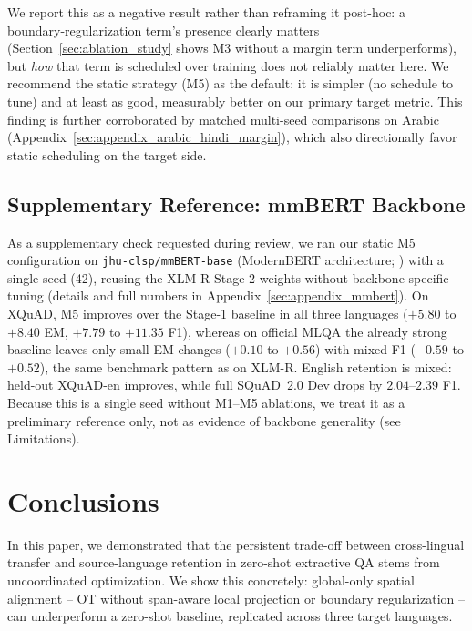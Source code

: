\documentclass[11pt]{article}
\begin{document}
We report this as a negative result rather than reframing it post-hoc: a boundary-regularization term's presence clearly matters (Section~\ref{sec:ablation_study} shows M3 without a margin term underperforms), but \emph{how} that term is scheduled over training does not reliably matter here. We recommend the static strategy (M5) as the default: it is simpler (no schedule to tune) and at least as good, measurably better on our primary target metric. This finding is further corroborated by matched multi-seed comparisons on Arabic (Appendix~\ref{sec:appendix_arabic_hindi_margin}), which also directionally favor static scheduling on the target side.

\subsection{Supplementary Reference: mmBERT Backbone}
\label{sec:mmbert_generalization}
As a supplementary check requested during review, we ran our static M5 configuration on \texttt{jhu-clsp/mmBERT-base} \citep{marone2026mmbert} (ModernBERT architecture; \citealp{warner-etal-2025-smarter}) with a single seed (42), reusing the XLM-R Stage-2 weights without backbone-specific tuning (details and full numbers in Appendix~\ref{sec:appendix_mmbert}). On XQuAD, M5 improves over the Stage-1 baseline in all three languages ($+5.80$ to $+8.40$ EM, $+7.79$ to $+11.35$ F1), whereas on official MLQA the already strong baseline leaves only small EM changes ($+0.10$ to $+0.56$) with mixed F1 ($-0.59$ to $+0.52$), the same benchmark pattern as on XLM-R. English retention is mixed: held-out XQuAD-en improves, while full SQuAD~2.0 Dev drops by $2.04$--$2.39$ F1. Because this is a single seed without M1--M5 ablations, we treat it as a preliminary reference only, not as evidence of backbone generality (see Limitations).


\section{Conclusions}
In this paper, we demonstrated that the persistent trade-off between cross-lingual transfer and source-language retention in zero-shot extractive QA stems from uncoordinated optimization. We show this concretely: global-only spatial alignment -- OT without span-aware local projection or boundary regularization -- can underperform a zero-shot baseline, replicated across three target languages.
\end{document}
